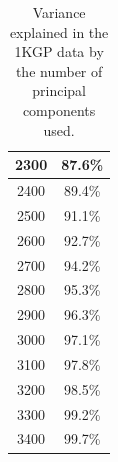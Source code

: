 \documentclass[12pt]{pnas-new}
\begin{document}
\begin{table}[htb!]
\begin{tabular}{||c c||}
\hline
2300 & 87.6\% \\
\hline
2400 & 89.4\% \\
\hline
2500 & 91.1\% \\
\hline
2600 & 92.7\% \\
\hline
2700 & 94.2\% \\
\hline
2800 & 95.3\% \\
\hline
2900 & 96.3\% \\
\hline
3000 & 97.1\% \\
\hline
3100 & 97.8\% \\
\hline
3200 & 98.5\% \\
\hline
3300 & 99.2\% \\
\hline
3400 & 99.7\% \\[1ex] 
 \hline
 \end{tabular}
 \caption{Variance explained in the 1KGP data by the number of principal components used.}
 \label{table:1KGP_var_exp}
\end{table}
\end{document}
